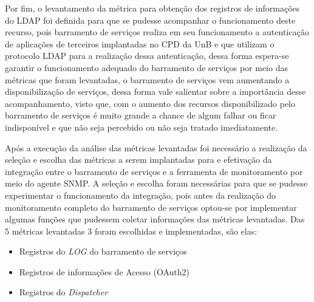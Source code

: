{Por fim, o levantamento da métrica para obtenção dos registros de informações do LDAP foi definida para que se pudesse acompanhar o funcionamento deste recurso, pois barramento de serviços realiza em seu funcionamento a autenticação de aplicações de terceiros implantadas no CPD da UnB e que utilizam o protocolo LDAP para a realização dessa autenticação, dessa forma espera-se garantir o funcionamento adequado do barramento de serviços por meio das métricas que foram levantadas, o barramento de serviços vem aumentando a disponibilização de serviços, dessa forma vale salientar sobre a importância desse acompanhamento, visto que, com o aumento dos recursos disponibilizado pelo barramento de serviços é muito grande a chance de algum falhar ou ficar indisponível e que não seja percebido ou não seja tratado imediatamente.  

Após a execução da análise das métricas levantadas foi necessário a realização da seleção e escolha das métricas a serem implantadas para e efetivação da integração entre o barramento de serviços e a ferramenta de monitoramento por meio do agente \acrshort{SNMP}. A seleção e escolha foram necessárias para que se pudesse experimentar o funcionamento da integração, pois antes da realização do monitoramento completo do barramento de serviços optou-se por implementar algumas funções que pudessem coletar informações das métricas levantadas. Das 5 métricas levantadas 3 foram escolhidas e implementadas, são elas: 

\begin{itemize}
    \item Registros do \textit{LOG} do barramento de serviços
    \item Registros de informações de Acesso (OAuth2)
    \item Registros do \textit{Dispatcher}
\end{itemize}

}
